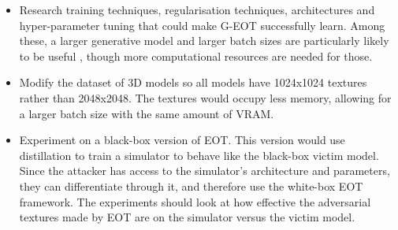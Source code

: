 \begin{itemize}	
		
	\item Research training techniques, regularisation techniques, architectures and hyper-parameter tuning that could make G-EOT successfully learn. Among these, a larger generative model and larger batch sizes are particularly likely to be useful \cite{big_gan}, though more computational resources are needed for those.
	
	\item Modify the dataset of 3D models so all models have 1024x1024 textures rather than 2048x2048. The textures would occupy less memory, allowing for a larger batch size with the same amount of VRAM. 
	
	\item Experiment on a black-box version of EOT. This version would use distillation \cite{distillation} to train a simulator to behave like the black-box victim model. Since the attacker has access to the simulator's architecture and parameters, they can differentiate through it, and therefore use the white-box EOT framework. The experiments should look at how effective the adversarial textures made by EOT are on the simulator versus the victim model.  
			
\end{itemize}
